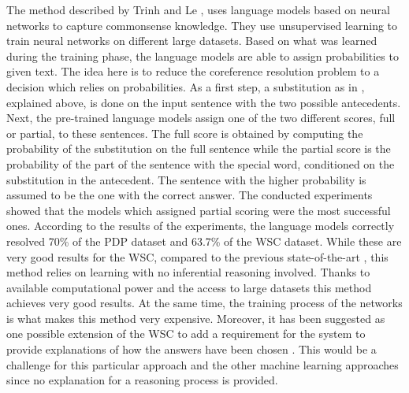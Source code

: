 The method described by Trinh and Le \cite{DBLP:journals/corr/abs-1806-02847}, uses language models based on neural networks to capture commonsense knowledge. They use unsupervised learning to train neural networks on different large datasets. Based on what was learned during the training phase, the language models are able to assign probabilities to given text. The idea here is to reduce the coreference resolution problem to a decision which relies on probabilities. As a first step, a substitution as in \cite{W18-4105}, explained above, is done on the input sentence with the two possible antecedents. Next, the pre-trained language models assign one of the two different scores, full or partial, to these sentences. The full score is obtained by computing the probability of the substitution on the full sentence while the partial score is the probability of the part of the sentence with the special word, conditioned on the substitution in the antecedent. The sentence with the higher probability is assumed to be the one with the correct answer. The conducted experiments showed that the models which assigned partial scoring were the most successful ones. According to the results of the experiments, the language models correctly resolved 70\% of the PDP dataset and 63.7\% of the WSC dataset. 
While these are very good results for the WSC, compared to the previous state-of-the-art \cite{DBLP:journals/corr/LiuJLZWH16}, this method relies on learning with no inferential reasoning involved. Thanks to available computational power and the access to large datasets this method achieves very good results. At the same time, the training process of the networks is what makes this method very expensive. Moreover, it has been suggested as one possible extension of the WSC to add a requirement for the system to provide explanations of how the answers have been chosen \cite{DBLP:conf/aaai/MorgensternO15}. This would be a challenge for this particular approach and the other machine learning approaches since no explanation for a reasoning process is provided.   %


